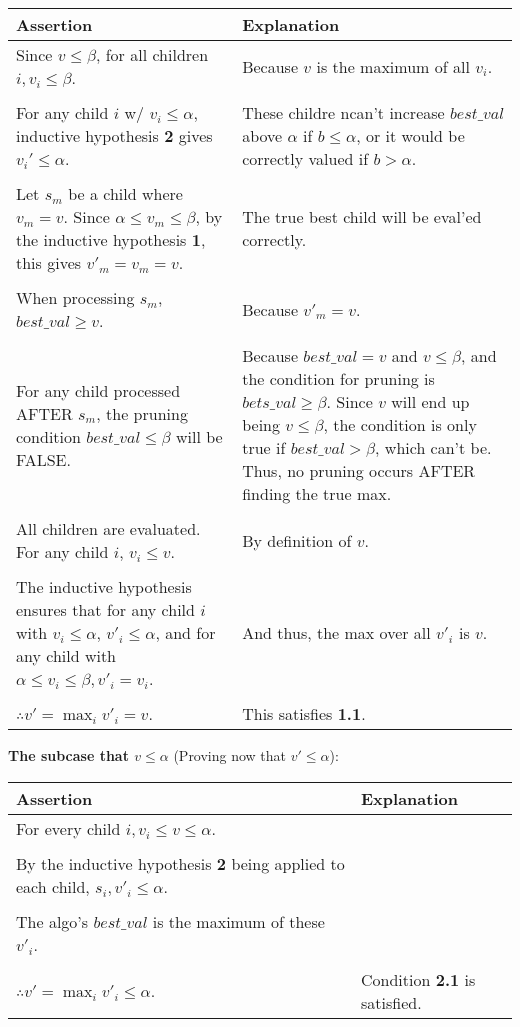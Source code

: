 \documentclass[11pt]{article}
\newenvironment{answercols}
  {\begin{center}\begin{tabular}{p{0.45\textwidth}p{0.45\textwidth}}
   \toprule
   \textbf{Assertion} & \textbf{Explanation} \\
   \midrule}
  {\\ \bottomrule\end{tabular}\end{center}}
\begin{document}
    \begin{answercols}
        Since $v \le \beta$, for all children $i, v_{i} \le \beta$. &
        Because $v$ is the maximum of all $v_{i}$. \\
        \\
        For any child $i$ w/ $v_{i} \le \alpha$, inductive hypothesis \textbf{2} gives $v_{i}' \le \alpha$. &
        These childre ncan't increase $best\_val$ above $\alpha$ if $b \le \alpha$, or it would be correctly valued if $b > \alpha$. \\
        \\
        Let $s_{m}$ be a child where $v_{m} = v$. Since $\alpha \le v_{m} \le \beta$, by the inductive hypothesis \textbf{1}, this gives $v'_{m} = v_{m} = v$. &
        The true best child will be eval'ed correctly. \\
        \\
        When processing $s_{m}$, $best\_val \ge v$. &
        Because $v'_{m} = v$. \\
        \\
        For any child processed AFTER $s_{m}$, the pruning condition $best\_val \le \beta$ will be FALSE. &
        Because $best\_val = v$ and $v \le \beta$, and the condition for pruning is $bets\_val \ge \beta$. Since $v$ will end up being $v \le \beta$, the condition is only true if $best\_val > \beta$, which can't be. Thus, no pruning occurs AFTER finding the true max. \\
        \\
        All children are evaluated. For any child $i$, $v_{i} \le v$. &
        By definition of $v$. \\
        \\
        The inductive hypothesis ensures that for any child $i$ with $v_i \le \alpha$, $v'_{i} \le \alpha$, and for any child with $\alpha \le v_i \le \beta, v'_{i} = v_i$. &
        And thus, the max over all $v'_{i}$ is $v$. \\
        \\
        $\therefore v' = \max_{i} v'_{i} = v$. &
        This satisfies \textbf{1.1}.
    \end{answercols}

    \newpage

    \textbf {The subcase that $v \le \alpha$} (Proving now that $v' \le \alpha$):

    \begin{answercols}
        For every child $i, v_i \le v \le \alpha$. \\
        \\
        By the inductive hypothesis \textbf{2} being applied to each child, $s_{i}, v'_{i} \le \alpha$. \\
        \\
        The algo's $best\_val$ is the maximum of these $v'_{i}$. \\
        \\
        $\therefore v' = \max_{i} v'_{i} \le \alpha$. &
        Condition \textbf{2.1} is satisfied.
    \end{answercols}
\end{document}
